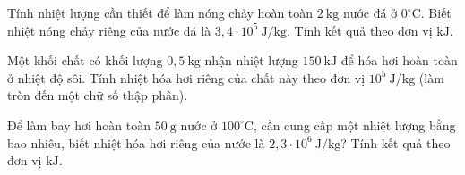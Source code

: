 \begin{bt}
	{\color{red}\footnotesize\ttfamily [L12C1B1-TLN-7]}\par %
	Tính nhiệt lượng cần thiết để làm nóng chảy hoàn toàn $2\ \mathrm{kg}$ nước đá ở $0^\circ\mathrm{C}$. Biết nhiệt nóng chảy riêng của nước đá là $3{,}4 \cdot 10^5\ \mathrm{J/kg}$. Tính kết quả theo đơn vị $\mathrm{kJ}$.
	\loigiai{
		\[
		\begin{aligned}
			Q &= m\lambda \\
			&= 2 \cdot 3{,}4 \cdot 10^5 \\
			&= 6{,}8 \cdot 10^5\ \mathrm{J} = 680\ \mathrm{kJ}.
		\end{aligned}
		\]
	}
\end{bt}

\begin{bt}
	{\color{red}\footnotesize\ttfamily [L12C1B1-TLN-8]}\par %
	Một khối chất có khối lượng $0{,}5\ \mathrm{kg}$ nhận nhiệt lượng $150\ \mathrm{kJ}$ để hóa hơi hoàn toàn ở nhiệt độ sôi. Tính nhiệt hóa hơi riêng của chất này theo đơn vị $10^5\ \mathrm{J/kg}$ (làm tròn đến một chữ số thập phân).
	\loigiai{
		\[
		\begin{aligned}
			L &= \frac{Q}{m} \\
			&= \frac{150\,000}{0{,}5} \\
			&= 300\,000\ \mathrm{J/kg} = 3{,}0 \cdot 10^5\ \mathrm{J/kg}.
		\end{aligned}
		\]
	}
\end{bt}

\begin{bt}
	{\color{red}\footnotesize\ttfamily [L12C1B1-TLN-9]}\par %
	Để làm bay hơi hoàn toàn $50\ \mathrm{g}$ nước ở $100^\circ\mathrm{C}$, cần cung cấp một nhiệt lượng bằng bao nhiêu, biết nhiệt hóa hơi riêng của nước là $2{,}3 \cdot 10^6\ \mathrm{J/kg}$? Tính kết quả theo đơn vị $\mathrm{kJ}$.
	\loigiai{
		\[
		\begin{aligned}
			Q &= mL \\
			&= 0{,}05 \cdot 2{,}3 \cdot 10^6 \\
			&= 115\,000\ \mathrm{J} = 115\ \mathrm{kJ}.
		\end{aligned}
		\]
	}
\end{bt}

